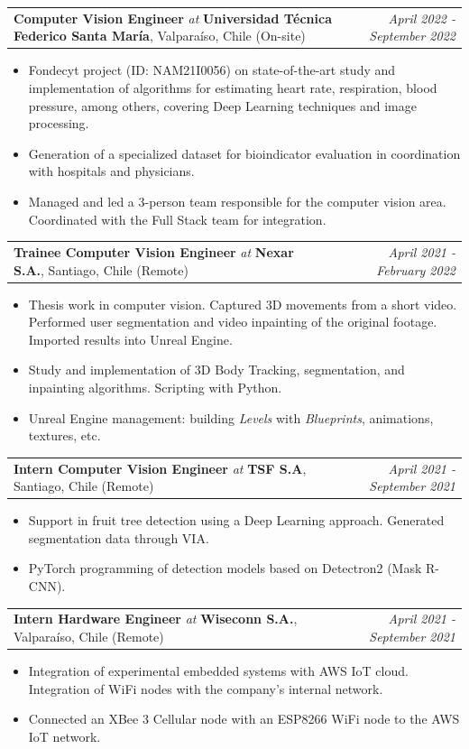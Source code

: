 \documentclass[11pt, letterpaper]{article}
\makeatletter
\newcommand{\experience}[5]{%
  \noindent
  \begin{tabularx}{\linewidth}{@{}X r@{}}
    \textbf{#1} \textit{at} \textbf{#2}, #3 & \textit{#4}
  \end{tabularx}
  \vspace{-10pt}
  #5
  \vspace{2pt}
}
\makeatother
\begin{document}
\experience
  {Computer Vision Engineer}
  {Universidad T\'ecnica Federico Santa Mar\'ia}
  {Valpara\'iso, Chile (On-site)}
  {April 2022 - September 2022}
  {
    \begin{itemize}
      \item Fondecyt project (ID: NAM21I0056) on state-of-the-art study and implementation of algorithms for estimating heart rate, respiration, blood pressure, among others, covering Deep Learning techniques and image processing.
        \item Generation of a specialized dataset for bioindicator evaluation in coordination with hospitals and physicians.
        \item Managed and led a 3-person team responsible for the computer vision area. Coordinated with the Full Stack team for integration.
    \end{itemize}
  }
\experience
  {Trainee Computer Vision Engineer}
  {Nexar S.A.}
  {Santiago, Chile (Remote)}
  {April 2021 - February 2022}
  {
    \begin{itemize}
        \item Thesis work in computer vision. Captured 3D movements from a short video. Performed user segmentation and video inpainting of the original footage. Imported results into Unreal Engine.
        \item Study and implementation of 3D Body Tracking, segmentation, and inpainting algorithms. Scripting with Python.
        \item Unreal Engine management: building \textit{Levels} with \textit{Blueprints}, animations, textures, etc.
    \end{itemize}
  }
\experience
  {Intern Computer Vision Engineer}
  {TSF S.A}
  {Santiago, Chile (Remote)}
  {April 2021 - September 2021}
  {
    \begin{itemize}
        \item Support in fruit tree detection using a Deep Learning approach. Generated segmentation data through VIA.
        \item PyTorch programming of detection models based on Detectron2 (Mask R-CNN).
    \end{itemize}
  }
\experience
  {Intern Hardware Engineer}
  {Wiseconn S.A.}
  {Valpara\'iso, Chile (Remote)}
  {April 2021 - September 2021}
  {
    \begin{itemize}
        \item Integration of experimental embedded systems with AWS IoT cloud. Integration of WiFi nodes with the company's internal network.
        \item Connected an XBee 3 Cellular node with an ESP8266 WiFi node to the AWS IoT network.
    \end{itemize}
  }
\end{document}
